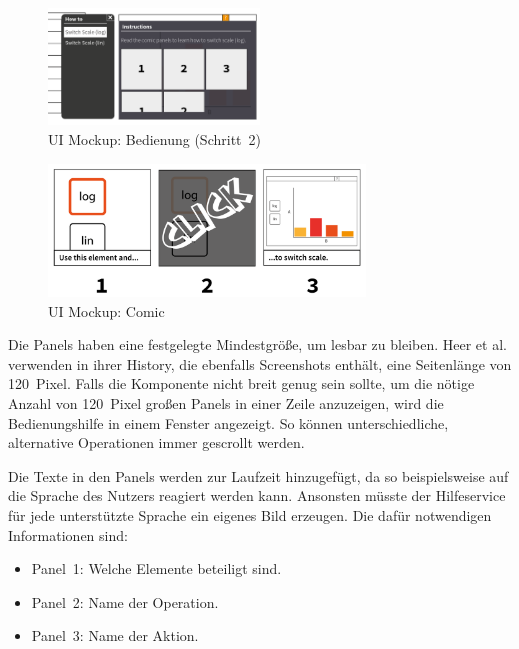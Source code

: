\documentclass[
	headsepline,
	footsepline,
	fontsize=12pt,
	bibliography=totoc
]{scrbook}
\begin{document}
\begin{figure}[htbp]
   \centering
   \includegraphics[width=0.5\textwidth]{images/konzeption-bedienung-step2.png}
   \caption{UI Mockup: Bedienung (Schritt~2)}
   \label{figure:bedienung-step2}
\end{figure}

\begin{figure}[htbp]
   \centering
   \includegraphics[width=0.75\textwidth]{images/konzeption-bedienung-comic.png}
   \caption{UI Mockup: Comic}
   \label{figure:bedienung-comic}
\end{figure}

Die Panels haben eine festgelegte Mindestgröße, um lesbar zu bleiben. Heer et al. \cite{Heer2008} verwenden in ihrer History, die ebenfalls Screenshots enthält, eine Seitenlänge von 120~Pixel. Falls die Komponente nicht breit genug sein sollte, um die nötige Anzahl von 120~Pixel großen Panels in einer Zeile anzuzeigen, wird die Bedienungshilfe in einem Fenster angezeigt. So können unterschiedliche, alternative Operationen immer gescrollt werden.

Die Texte in den Panels werden zur Laufzeit hinzugefügt, da so beispielsweise auf die Sprache des Nutzers reagiert werden kann. Ansonsten müsste der Hilfeservice für jede unterstützte Sprache ein eigenes Bild erzeugen. Die dafür notwendigen Informationen sind:

\begin{itemize}
	\item Panel~1: Welche Elemente beteiligt sind.
	\item Panel~2: Name der Operation.
	\item Panel~3: Name der Aktion.
\end{itemize}
\end{document}
